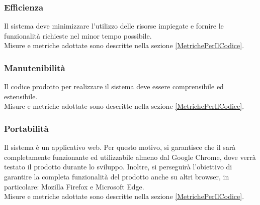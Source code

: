 \documentclass[../PianoDiQualifica.tex]{subfiles}
\begin{document}
			\subsubsection{Efficienza}
				Il sistema deve minimizzare l'utilizzo delle risorse impiegate e
				fornire le funzionalità richieste nel minor tempo possibile.\\
				Misure e metriche adottate sono descritte nella sezione \ref{MetrichePerIlCodice}.
			\subsubsection{Manutenibilità}
				Il codice prodotto per realizzare il sistema deve essere comprensibile
				ed estensibile.\\
				Misure e metriche adottate sono descritte nella sezione \ref{MetrichePerIlCodice}.
			\subsubsection{Portabilità}
				Il sistema è un applicativo web. Per questo motivo, si garantisce che
				il  sarà completamente funzionante ed utilizzabile
				almeno dal 	Google Chrome, dove verrà testato il prodotto
				durante lo sviluppo. Inoltre, si perseguirà l'obiettivo di garantire la
				completa funzionalità del prodotto anche su altri browser, in particolare:
				Mozilla Firefox e Microsoft Edge.\\
				Misure e metriche adottate sono descritte nella sezione \ref{MetrichePerIlCodice}.
\end{document}
